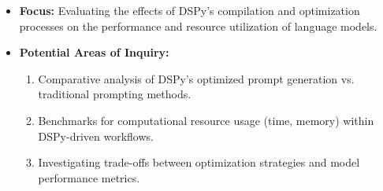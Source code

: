 \begin{enumerate}
\begin{itemize}
    \item \textbf{Focus:} Evaluating the effects of DSPy's compilation and optimization processes on the performance and resource utilization of language models.

    \item \textbf{Potential Areas of Inquiry:}
        \begin{enumerate}
            \item Comparative analysis of DSPy's optimized prompt generation vs. traditional prompting methods.
            \item Benchmarks for computational resource usage (time, memory) within DSPy-driven workflows.
            \item Investigating trade-offs between optimization strategies and model performance metrics. 
        \end{enumerate}
\end{itemize}
\end{enumerate}

